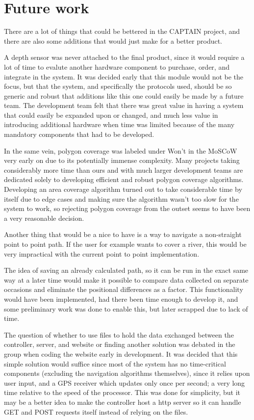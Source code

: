 \newpage
\chapter{Future work}
There are a lot of things that could be bettered in the CAPTAIN project, and there are also some additions that would just make for a better product.

A depth sensor was never attached to the final product, since it would require a lot of time to evalute another hardware component to purchase, order, and integrate in the system. It was decided early that this module would not be the focus, but that the system, and specifically the protocols used, should be so generic and robust that additions like this one could easily be made by a future team. The development team felt that there was great value in having a system that could easily be expanded upon or changed, and much less value in introducing additional hardware when time was limited because of the many mandatory components that had to be developed. 

In the same vein, polygon coverage was labeled under Won't in the MoSCoW very early on due to its potentially immense complexity. Many projects taking considerably more time than ours and with much larger development teams are dedicated solely to developing efficient and robust polygon coverage algorithms. Developing an area coverage algorithm turned out to take considerable time by itself due to edge cases and making sure the algorithm wasn't too slow for the system to work, so rejecting polygon coverage from the outset seems to have been a very reasonable decision.

Another thing that would be a nice to have is a way to navigate a non-straight point to point path. If the user for example wants to cover a river, this would be very impractical with the current point to point implementation. 

The idea of saving an already calculated path, so it can be run in the exact same way at a later time would make it possible to compare data collected on separate occasions and eliminate the positional differences as a factor. This functionality would have been implemented, had there been time enough to develop it, and some preliminary work was done to enable this, but later scrapped due to lack of time.

The question of whether to use files to hold the data exchanged between the controller, server, and website or finding another solution was debated in the group when coding the website early in development. It was decided that this simple solution would suffice since most of the system has no time-critical components (excluding the navigation algorithms themselves), since it relies upon user input, and a GPS receiver which updates only once per second; a very long time relative to the speed of the processor. This was done for simplicity, but it may be a better idea to make the controller host a http server so it can handle GET and POST requests itself instead of relying on the files. 


